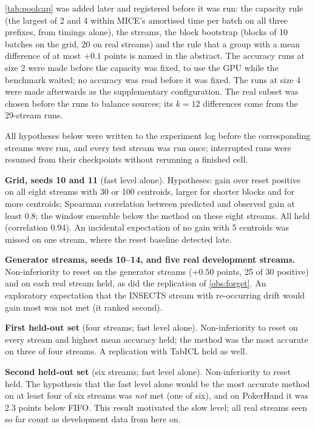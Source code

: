 \documentclass[11pt]{article}
\theoremstyle{plain}
\theoremstyle{definition}
\theoremstyle{remark}
\newcommand{\method}{\textsc{MICE}}   %
\begin{document}
\cref{tab:poolcap} was added later and registered before it was run: the capacity rule (the largest
of 2 and 4 within \method{}'s amortised time per batch on all three prefixes, from timings alone), the streams, the
block bootstrap (blocks of 10 batches on the grid, 20 on real streams) and the rule that a group with a mean difference
of at most $+0.1$ points is named in the abstract. The accuracy runs at size 2 were made before the
capacity was fixed, to use the GPU while the benchmark waited; no accuracy was read before it was fixed. The runs at size 4 were made afterwards as the supplementary configuration. The real
subset was chosen before the runs to balance sources; its $k=12$ differences come from the 29-stream runs.

All hypotheses below were written to the experiment log before the corresponding streams were run, and every test
stream was run once; interrupted runs were resumed from their checkpoints without rerunning a finished cell.

\textbf{Grid, seeds 10 and 11} (fast level alone). Hypotheses: gain over reset positive on all eight streams with 30
or 100 centroids, larger for shorter blocks and for more centroids; Spearman correlation between predicted and
observed gain at least 0.8; the window ensemble below the method on these eight streams. All held (correlation
0.94). An incidental expectation of no gain with 5 centroids was missed on one stream, where the reset baseline
detected late.

\textbf{Generator streams, seeds 10--14, and five real development streams.} Non-inferiority to reset on the
generator streams ($+0.50$ points, 25 of 30 positive) and on each real stream held, as did the replication of
\cref{obs:forget}. An exploratory expectation that the INSECTS stream with re-occurring drift would gain most was not
met (it ranked second).

\textbf{First held-out set} (four streams; fast level alone). Non-inferiority to reset on every stream and highest
mean accuracy held; the method was the most accurate on three of four streams. A replication with TabICL held as
well.

\textbf{Second held-out set} (six streams; fast level alone). Non-inferiority to reset held. The hypothesis that the
fast level alone would be the most accurate method on at least four of six streams was \emph{not} met (one of six),
and on PokerHand it was 2.3 points below FIFO. This result motivated the slow level; all real streams seen so far
count as development data from here on.
\end{document}
